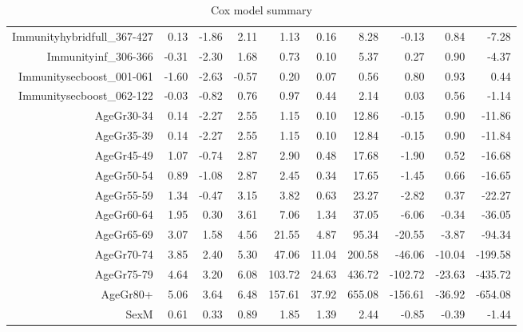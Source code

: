 \begin{table}[ht]
\begin{tabular}{rrrrrrrrrr}
  Immunityhybridfull\_367-427 & 0.13 & -1.86 & 2.11 & 1.13 & 0.16 & 8.28 & -0.13 & 0.84 & -7.28 \\ 
  Immunityinf\_306-366 & -0.31 & -2.30 & 1.68 & 0.73 & 0.10 & 5.37 & 0.27 & 0.90 & -4.37 \\ 
  Immunitysecboost\_001-061 & -1.60 & -2.63 & -0.57 & 0.20 & 0.07 & 0.56 & 0.80 & 0.93 & 0.44 \\ 
  Immunitysecboost\_062-122 & -0.03 & -0.82 & 0.76 & 0.97 & 0.44 & 2.14 & 0.03 & 0.56 & -1.14 \\ 
  AgeGr30-34 & 0.14 & -2.27 & 2.55 & 1.15 & 0.10 & 12.86 & -0.15 & 0.90 & -11.86 \\ 
  AgeGr35-39 & 0.14 & -2.27 & 2.55 & 1.15 & 0.10 & 12.84 & -0.15 & 0.90 & -11.84 \\ 
  AgeGr45-49 & 1.07 & -0.74 & 2.87 & 2.90 & 0.48 & 17.68 & -1.90 & 0.52 & -16.68 \\ 
  AgeGr50-54 & 0.89 & -1.08 & 2.87 & 2.45 & 0.34 & 17.65 & -1.45 & 0.66 & -16.65 \\ 
  AgeGr55-59 & 1.34 & -0.47 & 3.15 & 3.82 & 0.63 & 23.27 & -2.82 & 0.37 & -22.27 \\ 
  AgeGr60-64 & 1.95 & 0.30 & 3.61 & 7.06 & 1.34 & 37.05 & -6.06 & -0.34 & -36.05 \\ 
  AgeGr65-69 & 3.07 & 1.58 & 4.56 & 21.55 & 4.87 & 95.34 & -20.55 & -3.87 & -94.34 \\ 
  AgeGr70-74 & 3.85 & 2.40 & 5.30 & 47.06 & 11.04 & 200.58 & -46.06 & -10.04 & -199.58 \\ 
  AgeGr75-79 & 4.64 & 3.20 & 6.08 & 103.72 & 24.63 & 436.72 & -102.72 & -23.63 & -435.72 \\ 
  AgeGr80+ & 5.06 & 3.64 & 6.48 & 157.61 & 37.92 & 655.08 & -156.61 & -36.92 & -654.08 \\ 
  SexM & 0.61 & 0.33 & 0.89 & 1.85 & 1.39 & 2.44 & -0.85 & -0.39 & -1.44 \\ 
   \hline
\end{tabular}
\caption{Cox model summary} 
\end{table}
